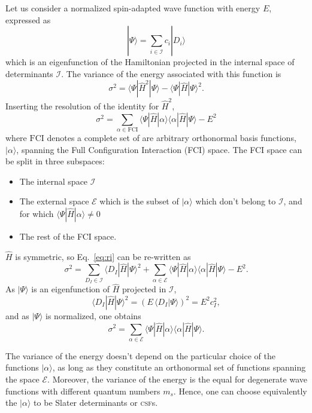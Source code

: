 \documentclass[aip,jcp,reprint,showkeys]{revtex4-1}
\newcommand{\ket}[1]{|#1\rangle}
\newcommand{\csf}{\textsc{csf}}
\newcommand{\mel}[3]{\langle #1 | #2 | #3 \rangle}
\begin{document}
Let us consider a normalized spin-adapted wave function with energy $E$, expressed as
\begin{equation}
\ket{\Psi} = \sum_{i \in \mathcal{I}} c_i \ket{D_i}
\end{equation}
which is an eigenfunction of the Hamiltonian projected in the internal space of
determinants $\mathcal{I}$.
The variance of the energy associated with this function is
\begin{equation}
\sigma^2 = \mel{\Psi}{\hat{H}^2}{\Psi} - \mel{\Psi}{\hat{H}}{\Psi}^2 .
\end{equation}
Inserting the resolution of the identity for $\hat{H}^2$, 
\begin{equation}
\sigma^2 = \sum_{\alpha \in \text{FCI}} \mel{\Psi}{\hat{H}}{\alpha} \mel{\alpha}{\hat{H}}{\Psi} - E^2
\label{eq:ri}
\end{equation}
where $\text{FCI}$ denotes a complete set of are arbitrary orthonormal basis
functions, $\ket{\alpha}$, spanning the Full Configuration Interaction (FCI)
space.
The FCI space can be split in three subspaces:
\begin{itemize}
\item The internal space $\mathcal{I}$
\item The external space $\mathcal{E}$ which is the subset of $\ket{\alpha}$ which
      don't belong to $\mathcal{I}$, and for which $\mel{\Psi}{\hat{H}}{\alpha}
      \ne 0$
\item The rest of the FCI space.
\end{itemize}
$\hat{H}$ is symmetric, so Eq.~\eqref{eq:ri} can be re-written as
\begin{equation}
\sigma^2 = \sum_{D_I    \in \mathcal{I}} \mel{D_I}{\hat{H}}{\Psi}^2 
         + \sum_{\alpha \in \mathcal{E}} \mel{\Psi}{\hat{H}}{\alpha} \mel{\alpha}{\hat{H}}{\Psi} - E^2.
\end{equation}
As $\ket{\Psi}$ is an eigenfunction of $\hat{H}$ projected in $\mathcal{I}$, 
\begin{equation}
\mel{D_I}{\hat{H}}{\Psi}^2 = \left( E\, \langle D_I | \Psi \rangle \right)^2 = E^2 c_I^2,
\end{equation}
and as $\ket{\Psi}$ is normalized, one obtains
\begin{equation}
\sigma^2 = \sum_{\alpha \in \mathcal{E}} \mel{\Psi}{\hat{H}}{\alpha}\mel{\alpha}{\hat{H}}{\Psi}.
\end{equation} 

The variance of the energy doesn't depend on the particular choice of the
functions $\ket{\alpha}$, as long as they constitute an orthonormal set of
functions spanning the space $\mathcal{E}$. Moreover, the variance of the
energy is the equal for degenerate wave functions with different quantum
numbers $m_s$.  Hence, one can choose equivalently the $\ket{\alpha}$ to be
Slater determinants or \csf s.
\end{document}
